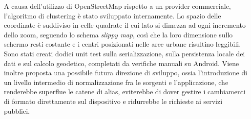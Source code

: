 \documentclass[a4paper, oneside, openright]{book}
\begin{document}
A causa dell'utilizzo di OpenStreetMap rispetto a un provider commerciale, l'algoritmo di clustering è stato
sviluppato internamente.
Lo spazio delle coordinate è suddiviso in celle quadrate il cui lato si dimezza ad ogni incremento
dello zoom, seguendo lo schema \emph{slippy map}, così che la loro dimensione sullo schermo resti costante e i centri
posizionati nelle aree urbane risultino leggibili.
Sono stati creati dodici unit test sulla serializzazione, sulla persistenza locale dei dati e sul calcolo geodetico,
completati da verifiche manuali su Android.
Viene inoltre proposta una possibile futura direzione di sviluppo, ossia l'introduzione di un livello intermedio di normalizzazione
fra le sorgenti e l'applicazione, che renderebbe superflue le catene di alias, eviterebbe di dover gestire i cambiamenti di formato
direttamente sul dispositivo e ridurrebbe le richieste ai servizi pubblici.

\end{document}
